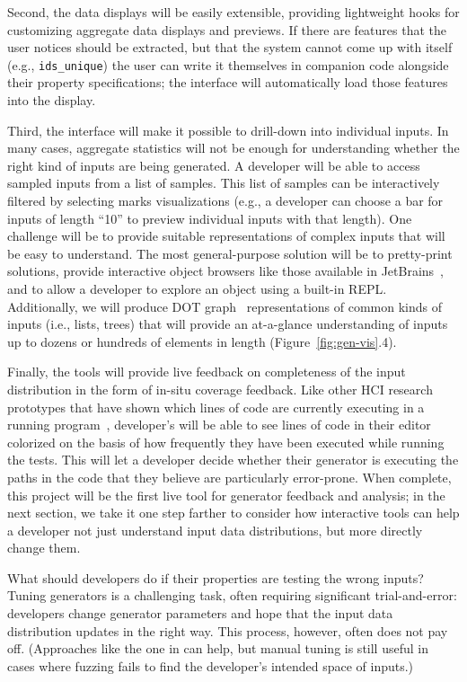 Second, the data displays will be easily extensible, providing lightweight hooks
for customizing aggregate data displays and previews. If
there are features that the user notices should be extracted, but that the
system cannot come up with itself (e.g., \lstinline{ids_unique}) the user can
write it themselves in companion code alongside their property specifications;
the interface will automatically load those features into the display.

Third, the interface will make it possible to drill-down into individual inputs.
In many cases, aggregate statistics will not be enough for understanding whether
the right kind of inputs are being generated. A developer will be able to access
sampled inputs from a list of samples. This list of samples can be interactively
filtered by selecting marks visualizations (e.g., a developer can choose a bar
for inputs of length ``10'' to preview individual inputs with that length). One
challenge will be to provide suitable representations of complex inputs that
will be easy to understand. The most general-purpose solution will be to
pretty-print solutions, provide interactive object browsers like those available
in JetBrains~\cite{tool:jetbrains}, and to allow a developer to explore an
object using a built-in REPL. Additionally, we will produce DOT
graph~\cite{ellson_graphviz_2002} representations of common kinds of inputs
(i.e., lists, trees) that will provide an at-a-glance understanding of inputs up
to dozens or hundreds of elements in length (Figure~\ref{fig:gen-vis}.4).

Finally, the tools will provide live feedback on completeness of the input
distribution in the form of in-situ coverage feedback. Like other HCI research
prototypes that have shown which lines of code are currently executing in a
running
program~\cite{ref:brandt2010rehearse,ref:oney2009firecrystal,ref:burg2013record},
developer's will be able to see lines of code in their editor colorized on the
basis of how frequently they have been executed while running the
tests. This will let a developer decide whether their generator is executing the
paths in the code that they believe are particularly error-prone.
When complete, this project will be the first live tool for generator
feedback and analysis; in the next section, we take it one step farther to
consider how interactive tools can help a developer not just understand input
data distributions, but more directly change them.

%
What should developers do if their properties are testing the wrong
inputs? Tuning generators is a challenging task, often requiring significant
trial-and-error: developers change generator parameters and
hope that the input data distribution updates in the right way. This
process, however, often does not pay off. (Approaches like the one in
 can help, but manual tuning is still useful in cases
where fuzzing fails to find the developer's intended space of inputs.)

